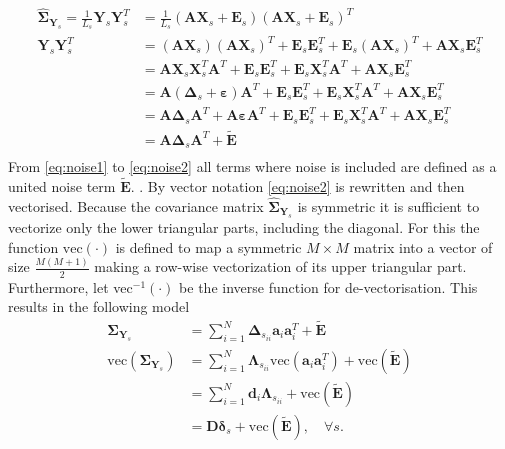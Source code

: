 \begin{align} 
\hat{\boldsymbol{\Sigma}}_{\mathbf{Y}_s} = 
\frac{1}{L_s}\mathbf{Y}_s \mathbf{Y}_s^T &= 
\frac{1}{L_s} \left( \mathbf{A} \mathbf{X}_s + \mathbf{E}_s \right) \left( \mathbf{A} \mathbf{X}_s + \mathbf{E}_s\right)^T \nonumber \\ 
\mathbf{Y}_s \mathbf{Y}_s^T &= (\textbf{AX}_s)(\textbf{AX}_s)^T + \textbf{E}_s\textbf{E}_s^T+\textbf{E}_s(\textbf{AX}_s)^T+\textbf{AX}_s\textbf{E}_s^T \nonumber \\
&= \textbf{AX}_s\textbf{X}_s^T\textbf{A}^T +  \textbf{E}_s\textbf{E}_s^T + \textbf{E}_s\textbf{X}_s^T\textbf{A}^T + \textbf{AX}_s\textbf{E}_s^T \nonumber \\
&= \textbf{A}(\boldsymbol{\Delta}_s+\boldsymbol{\varepsilon})\textbf{A}^T + \textbf{E}_s\textbf{E}_s^T + \textbf{E}_s\textbf{X}_s^T\textbf{A}^T + \textbf{AX}_s\textbf{E}_s^T \nonumber \\
&= \textbf{A}\boldsymbol{\Delta}_s\textbf{A}^T + \textbf{A}\boldsymbol{\varepsilon}\textbf{A}^T + \textbf{E}_s\textbf{E}_s^T + \textbf{E}_s\textbf{X}_s^T\textbf{A}^T + \textbf{AX}_s\textbf{E}_s^T \label{eq:noise1}\\
&= \textbf{A}\boldsymbol{\Delta}_s\textbf{A}^T + \widetilde{\textbf{E}} \label{eq:noise2}\\
\end{align}
From \eqref{eq:noise1} to \eqref{eq:noise2} all terms where noise is included are defined as a united noise term $\widetilde{\textbf{E}}$. . By vector notation \eqref{eq:noise2} is rewritten and then vectorised. Because the covariance matrix $\hat{\boldsymbol{\Sigma}}_{\mathbf{Y}_s}$ is symmetric it is sufficient to vectorize only the lower triangular parts, including the diagonal. For this the function $\text{vec}(\cdot)$ is defined to map a symmetric $M \times M$ matrix into a vector of size $\frac{M(M+1)}{2}$ making a row-wise vectorization of its upper triangular part. Furthermore, let vec$^{-1}(\cdot)$ be the inverse function for de-vectorisation. This results in the following model        
\begin{align}
\boldsymbol{\Sigma}_{\mathbf{Y}_s} &= \sum_{i=1}^{N} \boldsymbol{\Delta}_{s_{ii}} \textbf{a}_i\textbf{a}_i^{T} + \widetilde{\textbf{E}} \nonumber \\
\text{vec}(\boldsymbol{\Sigma}_{\mathbf{Y}_s}) &= \sum_{i=1}^N \boldsymbol{\Lambda}_{s_{ii}} \text{vec}(\mathbf{a}_i \mathbf{a}_i^T) + \text{vec}( \widetilde{\textbf{E}}) \nonumber \\
&= \sum_{i=1}^N \mathbf{d}_i \boldsymbol{\Lambda}_{s_{ii}} + \text{vec}( \widetilde{\textbf{E}}) \nonumber \nonumber \\
&= \mathbf{D} \boldsymbol{\delta}_s + \text{vec}( \widetilde{\textbf{E}}), \quad \forall s. \label{eq:cov1}
\end{align}
